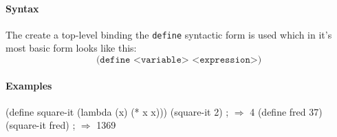 \documentclass[12pt,a4paper,draft,twoside]{article}
\begin{document}
\paragraph{Syntax}
The create a top-level binding the \texttt{define} syntactic form is used which in it's most basic form looks like this:
\begin{equation*}
\texttt{(define <variable> <expression>)}
\end{equation*}
\paragraph{Examples}
\begin{schemecode}
(define square-it (lambda (x) (* x x)))
(square-it 2) ; $\Rightarrow$ 4
(define fred 37)
(square-it fred) ; $\Rightarrow$ 1369
\end{schemecode}
 
\end{document}
